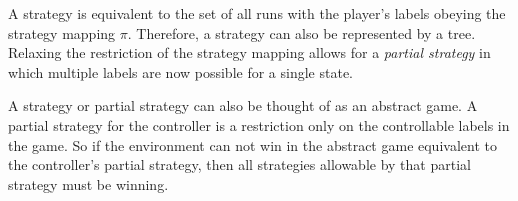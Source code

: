 \documentclass{llncs}
\begin{document}
A strategy is equivalent to the set of all runs with the player's labels
obeying the strategy mapping $\pi$. Therefore, a strategy can also be
represented by a tree. Relaxing the restriction of the strategy mapping allows
for a \emph{partial strategy} in which multiple labels are now possible for a
single state.

A strategy or partial strategy can also be thought of as an abstract game. A
partial strategy for the controller is a restriction only on the controllable
labels in the game. So if the environment can not win in the abstract game
equivalent to the controller's partial strategy, then all strategies allowable
by that partial strategy must be winning.
\end{document}
